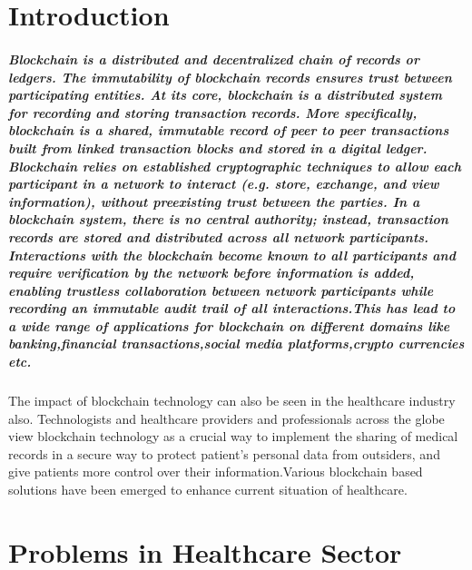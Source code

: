 \documentclass[12pt]{report}
\begin{document}
\tableofcontents
{}

\listoffigures


\chapter{Introduction}
\paragraph{
Blockchain is a distributed and decentralized chain of records or ledgers.
The immutability of blockchain records ensures trust between participating entities.
At its core, blockchain is a distributed system for recording and storing transaction
records.
More specifically, blockchain is a
shared, immutable record of peer to peer
transactions built from linked transaction
blocks and stored in a digital ledger.
Blockchain relies on established
cryptographic techniques to allow each
participant in a network to interact (e.g.
store, exchange, and view information),
without preexisting trust between the
parties. In a blockchain system, there is no
central authority; instead, transaction
records are stored and distributed across all
network participants. Interactions with the
blockchain become known to all participants
and require verification by the network
before information is added, enabling
trustless collaboration between network
participants while recording an immutable
audit trail of all interactions.This has lead to a wide range of applications for blockchain on different domains like banking,financial transactions,social media platforms,crypto currencies etc.}
\par The impact of blockchain technology can also be seen in the healthcare industry also. Technologists and healthcare providers and professionals across the globe view blockchain technology as a crucial way to implement the sharing of medical records in a secure way to protect patient's personal data from outsiders, and give patients more control over their information.Various blockchain based solutions have been emerged to enhance current situation of healthcare.

\chapter{Problems in Healthcare Sector}
\end{document}
